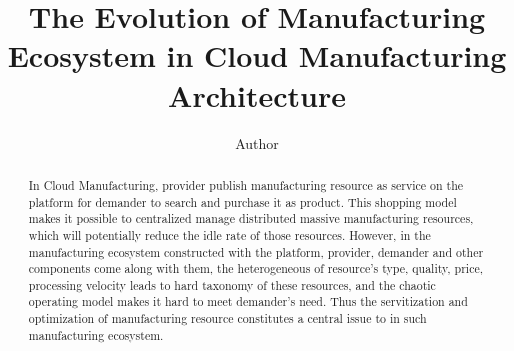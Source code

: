 
\title{The Evolution of Manufacturing Ecosystem in Cloud Manufacturing Architecture
}

\author[label1]{Author}
\address[label1]{ZJU}
\begin{abstract}
In Cloud Manufacturing, provider publish manufacturing resource as service on the platform for demander to search and purchase it as product. This shopping model makes it possible to centralized manage distributed massive manufacturing resources, which will potentially reduce the idle rate of those resources. 
However, in the manufacturing ecosystem constructed with the platform, provider, demander and other components come along with them, the heterogeneous of resource's type, quality, price, processing velocity leads to hard taxonomy of these resources, and the chaotic operating model makes it hard to meet demander's need.
Thus the servitization and optimization of manufacturing resource constitutes a central issue to  in such manufacturing ecosystem.











\end{abstract}

